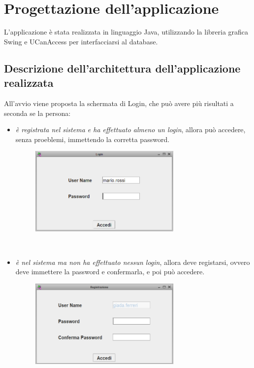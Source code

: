 \documentclass{article}
\begin{document}
\section{Progettazione dell'applicazione}
L'applicazione è stata realizzata in linguaggio Java, utilizzando la libreria grafica Swing e UCanAccess per interfacciarsi al database.\\\newline
\subsection{Descrizione dell'architettura dell'applicazione realizzata}
All’avvio viene proposta la schermata di Login, che può avere più risultati a seconda se la persona:
\begin{itemize}
\item  \textit{è registrata nel sistema e ha effettuato almeno un login}, allora può accedere, senza proeblemi, immettendo la corretta password.
\begin{figure}[htbp]
\centering
\includegraphics[width=0.7\textwidth]{img/rec_system.png}
\end{figure}\\\newline\newline
\item   \textit{è nel sistema ma non ha effettuato nessun login}, allora deve registarsi, ovvero deve immettere la password e confermarla, e poi può accedere.
\begin{figure}[htbp]
\centering
\includegraphics[width=0.7\textwidth]{img/rec_passw.png}
\end{figure}\\\newline\newline
\end{itemize}
\end{document}
